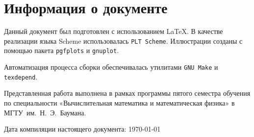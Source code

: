 \documentclass[titlepage]{article}
\newcommand{\program}[1]{{\tt #1}}
\newcommand{\name}{\textsc}
\theoremstyle{ruthm}
\numberwithin{thm}{section}
\theoremstyle{rurem}
\theoremstyle{rudfn}
\numberwithin{equation}{section}
\begin{document}
\clearpage
\section{Информация о документе}

Данный документ был подготовлен с использованием \LaTeX{}. В качестве
реализации языка Scheme использовалась \program{PLT Scheme}.
Иллюстрации созданы с помощью пакета \program{pgfplots} и
\program{gnuplot}.

Автоматизация процесса сборки обеспечивалась утилитами
\program{GNU Make} и \program{texdepend}.

Представленная работа выполнена в рамках программы пятого семестра
обучения по специальности «Вычислительная математика и математическая
физика» в МГТУ им. Н. Э. Баумана.

Дата компиляции настоящего документа: \today

\newcommand{\BibEmph}{\name}


\end{document}

